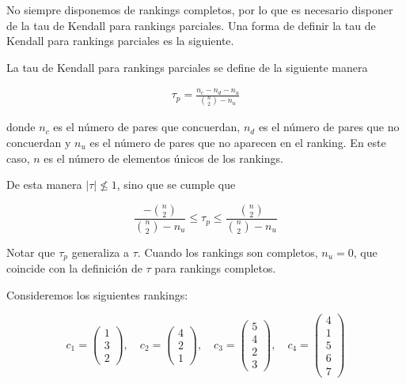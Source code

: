 No siempre disponemos de rankings completos, por lo que es necesario disponer de la tau de Kendall para rankings parciales. Una forma de definir la tau de Kendall para rankings parciales es la siguiente.

\begin{defi}

La tau de Kendall para rankings parciales se define de la siguiente manera

\begin{eqnarray}
\tau_p = \frac{n_c - n_d - n_u}{\binom{n}{2} - n_u}
\end{eqnarray}

donde $n_c$ es el número de pares que concuerdan, $n_d$ es el número de pares que no concuerdan y $n_u$ es el número de pares que no aparecen en el ranking. En este caso, $n$ es el número de elementos únicos de los rankings.

\end{defi}

De esta manera $|\tau| \not \leq 1$, sino que se cumple que

\begin{equation}
\dfrac{-\binom{n}{2}}{\binom{n}{2} - n_u} \leq \tau_p \leq \dfrac{\binom{n}{2}}{\binom{n}{2} - n_u}
\end{equation}

Notar que $\tau_p$ generaliza a $\tau$. Cuando los rankings son completos, $n_u = 0$, que coincide con la definición de $\tau$ para rankings completos.

\begin{ejemplo}
Consideremos los siguientes rankings:

\begin{equation*}
c_1 = \left( \begin{array}{c}
1\\
3\\
2
\end{array} \right), \quad
c_2 = \left( \begin{array}{c}
4\\
2\\
1
\end{array} \right), \quad
c_3 = \left( \begin{array}{c}
5\\
4\\
2\\
3
\end{array} \right), \quad
c_4 = \left( \begin{array}{c}
4\\
1\\
5\\
6\\
7
\end{array} \right)
\end{equation*}


\end{ejemplo}

